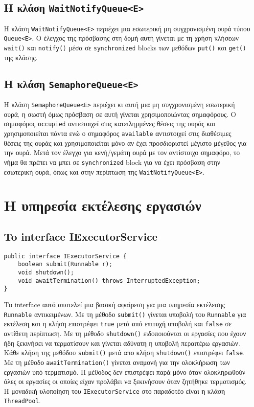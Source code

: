\documentclass[a4paper,11pt]{article}
\begin{document}
\begin{sloppypar}
\subsection{Η κλάση \texttt{WaitNotifyQueue<E>}}

Η κλάση \texttt{WaitNotifyQueue<E>} περιέχει μια εσωτερική μη συγχρονισμένη ουρά τύπου \texttt{Queue<E>}. Ο έλεγχος της πρόσβασης στη δομή αυτή γίνεται με τη χρήση κλήσεων \texttt{wait()} και \texttt{notify()} μέσα σε \texttt{synchronized} blocks των μεθόδων \texttt{put()} και \texttt{get()} της κλάσης.

\subsection{Η κλάση \texttt{SemaphoreQueue<E>}}

Η κλάση \texttt{SemaphoreQueue<E>} περιέχει κι αυτή μια μη συγχρονισμένη εσωτερική ουρά, η σωστή όμως πρόσβαση σε αυτή γίνεται χρησιμοποιώντας σημαφόρους. Ο σημαφόρος \texttt{occupied} αντιστοιχεί στις κατειλημμένες θέσεις της ουράς και χρησιμοποιείται πάντα ενώ ο σημαφόρος \texttt{available} αντιστοιχεί στις διαθέσιμες θέσεις της ουράς και χρησιμοποιείται μόνο αν έχει προσδιοριστεί μέγιστο μέγεθος για την ουρά. Μετά τον έλεγχο για κενή/γεμάτη ουρά με τον αντίστοιχο σημαφόρο, το νήμα θα πρέπει να μπει σε \texttt{synchronized} block για να έχει πρόσβαση στην εσωτερική ουρά, όπως και στην περίπτωση της \texttt{WaitNotifyQueue<E>}.

\section{Η υπηρεσία εκτέλεσης εργασιών}

\subsection{To interface IExecutorService}

\begin{lstlisting}
public interface IExecutorService {
    boolean submit(Runnable r);
    void shutdown();
    void awaitTermination() throws InterruptedException;
}

\end{lstlisting}

Το interface αυτό αποτελεί μια βασική αφαίρεση για μια υπηρεσία εκτέλεσης \texttt{Runnable} αντικειμένων. Με τη μέθοδο \texttt{submit()} γίνεται υποβολή του \texttt{Runnable} για εκτέλεση και η κλήση επιστρέφει \texttt{true} μετά από επιτυχή υποβολή και \texttt{false} σε αντίθετη περίπτωση. Με τη μέθοδο \texttt{shutdown()} ειδοποιούνται οι εργασίες που έχουν ήδη ξεκινήσει να τερματίσουν και γίνεται αδύνατη η υποβολή περαιτέρω εργασιών. Κάθε κλήση της μεθόδου \texttt{submit()} μετά απο κλήση \texttt{shutdown()} επιστρέφει \texttt{false}. Με τη μέθοδο \texttt{awaitTermination()} γίνεται αναμονή για την ολοκλήρωση των εργασιών υπό τερματισμό. Η μέθοδος δεν επιστρέφει παρά μόνο όταν ολοκληρωθούν όλες οι εργασίες οι οποίες είχαν προλάβει να ξεκινήσουν όταν ζητήθηκε τερματισμός. Η μοναδική υλοποίηση του \texttt{IExecutorService} στο παραδοτέο είναι η κλάση \texttt{ThreadPool}.


\end{sloppypar}
\end{document}
